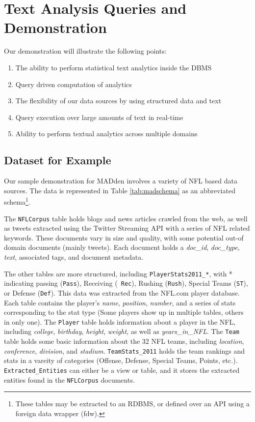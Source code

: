 \section{Text Analysis Queries and Demonstration}
Our demonstration will illustrate the following points: 
\begin{enumerate}
  \item The ability to perform statistical text analytics inside the DBMS
  \item Query driven computation of analytics
  \item The flexibility of our data sources by using structured data and text
  \item Query execution over large amounts of text in real-time
  \item Ability to perform textual analytics across multiple domains
\end{enumerate} 

\subsection{Dataset for Example}
Our sample demonstration for MADden involves a variety of NFL based data sources. 
The data is represented in Table \ref{tab:madschema} as an abbreviated
schema\footnote{These tables may be extracted to an RDBMS, or defined over an
API using a foreign data wrapper (fdw).}.

The {\tt NFLCorpus} table holds blogs
and news articles crawled from the web, as well as tweets extracted using the
Twitter Streaming API with a series of NFL related keywords. These documents
vary in size and quality, with some potential out-of domain documents (mainly
tweets). Each document holds a \textit{doc\_id}, \textit{doc\_type},
\textit{text}, associated tags, and document metadata.

The other tables are more structured,
including {\tt PlayerStats2011\_*}, with * indicating passing ({\tt Pass}), Receiving ({\tt
Rec}), Rushing ({\tt Rush}), Special Teams ({\tt ST}), or Defense ({\tt Def}).
This data was extracted from the NFL.com player database. Each table contains
the player's \textit{name}, \textit{position}, \textit{number}, and a series of
stats corresponding to the stat type (Some players show up in multiple tables, others in only one). The
{\tt Player} table holds information about a player in the NFL, including
\textit{college}, \textit{birthday}, \textit{height}, \textit{weight}, as well
as \textit{years\_in\_NFL}. The {\tt Team} table holds some basic information
about the 32 NFL teams, including \textit{location}, \textit{conference}, \textit{division}, and \textit{stadium}.
{\tt TeamStats\_2011} holds the team rankings and stats in a vareity of categories (Offense, Defense, Special Teams,
Points, etc.).
{\tt Extracted\_Entities} can either be a view or table, and it stores the
extracted entities found in the {\tt NFLCorpus} documents.

